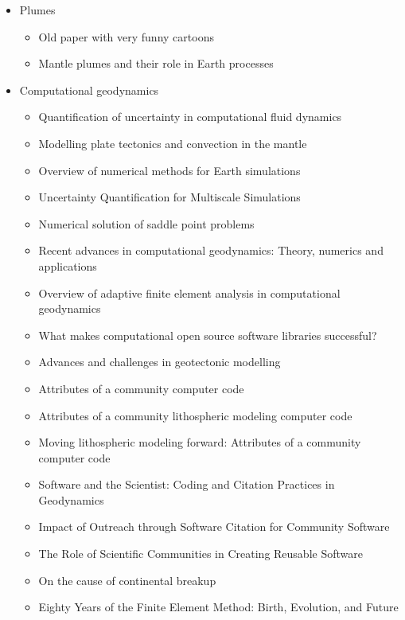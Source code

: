 \begin{itemize}
\item Plumes
   \begin{itemize}
   \item[\nineteenseventyseven] Old paper with very funny cartoons \cite{hovo77}
   \item[\twothousandtwentyone] Mantle plumes and their role in Earth processes \cite{kobj21}
   \end{itemize}


\item Computational geodynamics
   \begin{itemize}
   \item [\nineteenninetyseven] Quantification of uncertainty in computational fluid dynamics \cite{roac97}
   \item [\twothousand] Modelling plate tectonics and convection in the mantle \cite{mogz00}
   \item [\twothousandone] Overview of numerical methods for Earth simulations \cite{momd01}
   \item [\twothousandtwo] Uncertainty Quantification for Multiscale Simulations \cite{degg02}
   \item [\twothousandfive] Numerical solution of saddle point problems \cite{begl05}
   \item [\twothousandeight] Recent advances in computational geodynamics: Theory, numerics and applications \cite{kags08}
   \item [\twothousandthirteen] Overview of adaptive finite element analysis in computational geodynamics \cite{masm13}
   \item [\twothousandthirteen] What makes computational open source software libraries successful? \cite{bahe13}
   \item [\twothousandfourteen] Advances and challenges in geotectonic modelling \cite{bufy14}
   \item [\twothousandfifteen] Attributes of a community computer code \cite{comc15}
   \item [\twothousandfifteen] Attributes of a community lithospheric modeling computer code \cite{comc15}
   \item [\twothousandfifteen] Moving lithospheric modeling forward: Attributes of a community computer code \cite{comc15}
   \item [\twothousandseventeen] Software and the Scientist: Coding and Citation Practices in Geodynamics \cite{hwfs17}
   \item [\twothousandnineteen] Impact of Outreach through Software Citation for Community Software \cite{hwpc19}
   \item [\twothousandnineteen] The Role of Scientific Communities in Creating Reusable Software \cite{kehg19}
   \item [\twothousandtwenty] On the cause of continental breakup \cite{niu20}
   \item [\twothousandtwentytwo] Eighty Years of the Finite Element Method: Birth, Evolution, and Future \cite{lilp22}
   \end{itemize}


\end{itemize}
